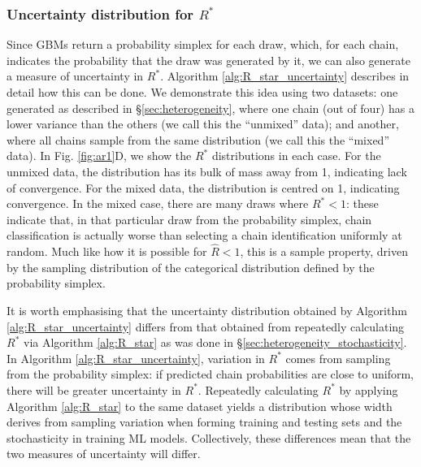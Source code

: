 \documentclass{article}
\begin{document}
\subsubsection{Uncertainty distribution for $R^*$}\label{sec:heterogeneity_uncertainty}
Since GBMs return a probability simplex for each draw, which, for each chain, indicates the probability that the draw was generated by it, we can also generate a measure of uncertainty in $R^*$. Algorithm \ref{alg:R_star_uncertainty} describes in detail how this can be done. We demonstrate this idea using two datasets: one generated as described in \S\ref{sec:heterogeneity}, where one chain (out of four) has a lower variance than the others (we call this the ``unmixed'' data); and another, where all chains sample from the same distribution (we call this the ``mixed'' data). In Fig. \ref{fig:ar1}D, we show the $R^*$ distributions in each case. For the unmixed data, the distribution has its bulk of mass away from 1, indicating lack of convergence. For the mixed data, the distribution is centred on 1, indicating convergence. In the mixed case, there are many draws where $R^*<1$: these indicate that, in that particular draw from the probability simplex, chain classification is actually worse than selecting a chain identification uniformly at random. Much like how it is possible for $\hat{R}<1$, this is a sample property, driven by the sampling distribution of the categorical distribution defined by the probability simplex.

It is worth emphasising that the uncertainty distribution obtained by Algorithm \ref{alg:R_star_uncertainty} differs from that obtained from repeatedly calculating $R^*$ via Algorithm \ref{alg:R_star} as was done in \S\ref{sec:heterogeneity_stochasticity}. In Algorithm \ref{alg:R_star_uncertainty}, variation in $R^*$ comes from sampling from the probability simplex: if predicted chain probabilities are close to uniform, there will be greater uncertainty in $R^*$. Repeatedly calculating $R^*$ by applying Algorithm \ref{alg:R_star} to the same dataset yields a distribution whose width derives from sampling variation when forming training and testing sets and the stochasticity in training ML models. Collectively, these differences mean that the two measures of uncertainty will differ.
\end{document}

